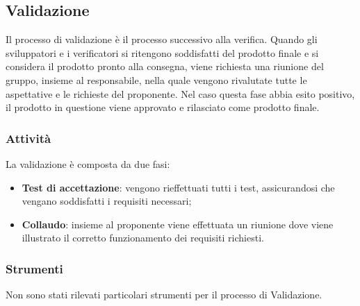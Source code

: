 \subsection{Validazione}
Il processo di validazione è il processo successivo alla verifica. Quando gli sviluppatori e i verificatori 
si ritengono soddisfatti del prodotto finale e si considera il prodotto pronto alla consegna, viene richiesta 
una riunione del gruppo, insieme al responsabile, nella quale vengono rivalutate tutte le aspettative e le 
richieste del proponente. Nel caso questa fase abbia esito positivo, il prodotto in questione viene approvato 
e rilasciato come prodotto finale.
\subsubsection{Attività}
La validazione è composta da due fasi:
\begin{itemize}
\item \textbf{Test di accettazione}: vengono rieffettuati tutti i test, assicurandosi che vengano soddisfatti 
i requisiti necessari;
\item \textbf{Collaudo}: insieme al proponente viene effettuata un riunione dove viene illustrato il corretto 
funzionamento dei requisiti richiesti. 
\end{itemize}

\subsubsection{Strumenti}
Non sono stati rilevati particolari strumenti per il processo di Validazione.
